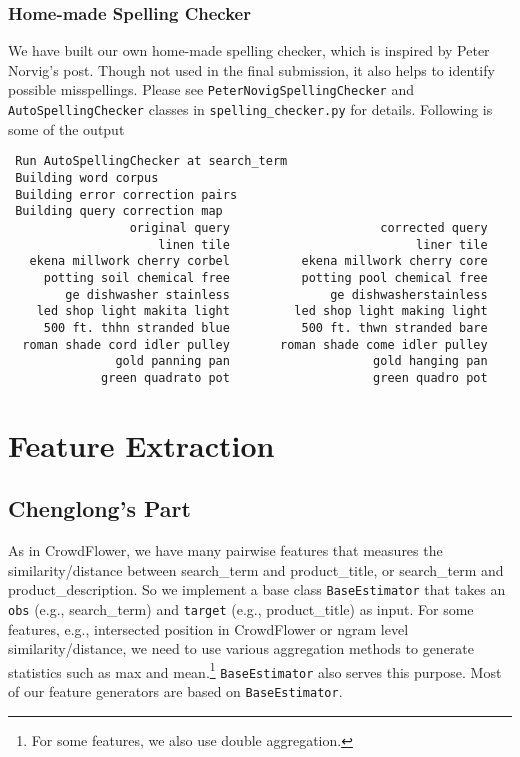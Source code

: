 \documentclass[12pt]{article}
\begin{document}
\subsubsection{Home-made Spelling Checker}
We have built our own home-made spelling checker, which is inspired by Peter Norvig's post\cite{PeterNorvig}. Though not used in the final submission, it also helps to identify possible misspellings. Please see \texttt{PeterNovigSpellingChecker} and \texttt{AutoSpellingChecker} classes in \texttt{spelling\_checker.py} for details. Following is some of the output
\begin{verbatim}
 Run AutoSpellingChecker at search_term
 Building word corpus
 Building error correction pairs
 Building query correction map
                 original query 	                corrected query
                     linen tile 	                     liner tile
   ekena millwork cherry corbel 	     ekena millwork cherry core
     potting soil chemical free 	     potting pool chemical free
        ge dishwasher stainless 	         ge dishwasherstainless
    led shop light makita light 	    led shop light making light
     500 ft. thhn stranded blue 	     500 ft. thwn stranded bare
  roman shade cord idler pulley 	  roman shade come idler pulley
               gold panning pan 	               gold hanging pan
             green quadrato pot 	               green quadro pot
\end{verbatim}

\section{Feature Extraction}
\subsection{Chenglong's Part}
\label{subsec:FeatureExtraction_Chenglong}
As in CrowdFlower, we have many pairwise features that measures the similarity/distance between search\_term and product\_title, or search\_term and product\_description. So we implement a base class \texttt{BaseEstimator} that takes an \texttt{obs} (e.g., search\_term) and \texttt{target} (e.g., product\_title) as input. For some features, e.g., intersected position in CrowdFlower or ngram level similarity/distance, we need to use various aggregation methods to generate statistics such as max and mean.\footnote{For some features, we also use double aggregation.} \texttt{BaseEstimator} also serves this purpose. Most of our feature generators are based on \texttt{BaseEstimator}.
\end{document}
